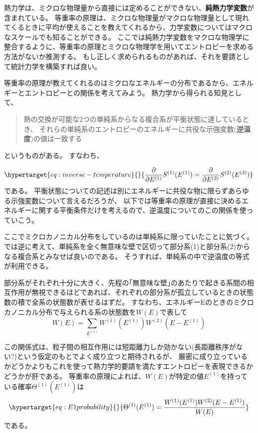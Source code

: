 \documentclass[
]{ltjsbook}
\begin{document}
熱力学は、ミクロな物理量から直接には定めることができない、\textbf{純熱力学変数}が含まれている。
等重率の原理は、ミクロな物理量がマクロな物理量として現れてくるときに平均が使えることを教えてくれるから、力学変数についてはマクロなスケールでも知ることができる。
ここでは純熱力学変数をマクロな物理学に整合するように、等重率の原理とミクロな物理学を用いてエントロピーを求める方法がないか推測する。
もし正しく求められるものがあれば、それを要請として統計力学を構築すれば良い。

等重率の原理が教えてくれるのはミクロなエネルギーの分布であるから、エネルギーとエントロピーとの関係を考えてみよう。
熱力学から得られる知見として、

\begin{quote}
熱の交換が可能な2つの単純系からなる複合系が平衡状態に達しているとき、
それらの単純系のエントロピーのエネルギーに共役な示強変数(\textbf{逆温度})の値は一致する
\end{quote}

というものがある。 すなわち、

\begin{equation}\protect\hypertarget{eq:inverse-temperature}{}{
\frac{\partial}{\partial E^{(1)}}S^{(1)}(E^{(1)})=\frac{\partial}{\partial E^{(2)}}S^{(2)}(E^{(2)})
}\label{eq:inverse-temperature}\end{equation} である。
平衡状態についての記述は別にエネルギーに共役な物に限らずあらゆる示強変数について言えるだろうが、
以下では等重率の原理が直接に決めるエネルギーに関する平衡条件だけを考えるので、逆温度についてのこの関係を使っていこう。

ここでミクロカノニカル分布をしているのは単純系に限っていたことに気づく。
では逆に考えて、単純系を全く無意味な壁で区切って部分系(1)と部分系(2)からなる複合系とみなせば良いのである。
そうすれば、単純系の中で逆温度の等式が利用できる。

部分系がそれぞれ十分に大きく、先程の｢無意味な壁｣のあたりで起きる系間の相互作用が無視できるほどであれば、それぞれの部分系が孤立しているときの状態数の積で全系の状態数が表せるはずだ。
すなわち、エネルギーEのときのミクロカノニカル分布で与えられる系の状態数を\(W(E)\)で表して
\[
W(E)=\sum_{E^{(1)}}W^{(1)}(E^{(1)})W^{(2)}(E-E^{(1)})
\]

この関係式は、粒子間の相互作用には短距離力しか効かない(長距離秩序がない?)という仮定のもとでよく成り立つと期待されるが、
厳密に成り立っているかどうかよりもこれを使って熱力学的要請を満たすエントロピーを表現できるかどうかが肝である。
等重率の原理によれば、\(W(E)\)が特定の値\(E^{(1)}\)を持っている確率\(\Theta^{(1)}(E^{(1)})\)は
\begin{equation}\protect\hypertarget{eq:E1probability}{}{
\Theta^{(1)}(E^{(1)}) = \frac{W^{(1)}(E^{(1)})W^{(2)}(E-E^{(1)})}{W(E)}
}\label{eq:E1probability}\end{equation} である。
\end{document}
